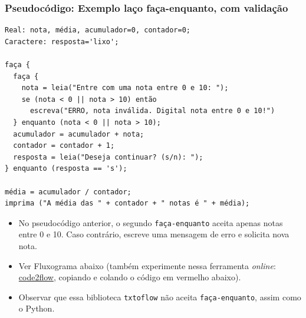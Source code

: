 \documentclass[12pt,a4paper]{article}
\providecommand{\tightlist}{%
      \setlength{\itemsep}{0pt}\setlength{\parskip}{0pt}}
\begin{document}
    \hypertarget{pseudocuxf3digo-exemplo-lauxe7o-fauxe7a-enquanto-com-validauxe7uxe3o}{%
\subsubsection{Pseudocódigo: Exemplo laço faça-enquanto, com
validação}\label{pseudocuxf3digo-exemplo-lauxe7o-fauxe7a-enquanto-com-validauxe7uxe3o}}

\begin{verbatim}
Real: nota, média, acumulador=0, contador=0;
Caractere: resposta='lixo';

faça {
  faça {
    nota = leia("Entre com uma nota entre 0 e 10: ");
    se (nota < 0 || nota > 10) então 
      escreva("ERRO, nota inválida. Digital nota entre 0 e 10!")
  } enquanto (nota < 0 || nota > 10); 
  acumulador = acumulador + nota;
  contador = contador + 1;
  resposta = leia("Deseja continuar? (s/n): ");
} enquanto (resposta == 's');

média = acumulador / contador;
imprima ("A média das " + contador + " notas é " + média);
\end{verbatim}

    \begin{itemize}
\tightlist
\item
  No pseudocódigo anterior, o segundo \texttt{faça-enquanto} aceita
  apenas notas entre 0 e 10. Caso contrário, escreve uma mensagem de
  erro e solicita nova nota.
\end{itemize}

    \begin{itemize}
\item
  Ver Fluxograma abaixo (também experimente nessa ferramenta
  \emph{online}: \href{https://app.code2flow.com/}{code2flow}, copiando
  e colando o código em vermelho abaixo).
\item
  Observar que essa biblioteca \texttt{txtoflow} não aceita
  \texttt{faça-enquanto}, assim como o Python.
\end{itemize}
\end{document}
